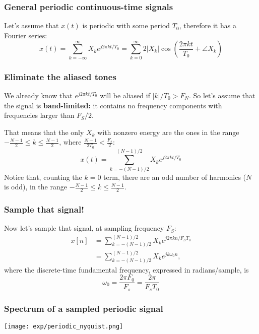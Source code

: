 \documentclass{beamer}
\begin{document}
\begin{frame}
  \frametitle{General periodic continuous-time signals}

  Let's assume that $x(t)$ is periodic with some period $T_0$,
  therefore it has a Fourier series:
  \[
  x(t) = \sum_{k=-\infty}^\infty X_k e^{j2\pi kt/T_0}
  = \sum_{k=0}^\infty 2|X_k|\cos\left(\frac{2\pi kt}{T_0}+\angle X_k\right)
  \]
\end{frame}

\begin{frame}
  \frametitle{Eliminate the aliased tones}

  We already know that $e^{j2\pi kt/T_0}$ will be aliased if $|k|/T_0 >
  F_N$.  So let's assume that the signal is {\bf band-limited:} it
  contains no frequency components with frequencies larger than $F_S/2$.

  That means that the only $X_k$ with nonzero energy are the ones in
  the range $-\frac{N-1}{2}\le k\le \frac{N-1}{2}$, where
  $\frac{N-1}{2T_0}<\frac{F_s}{2}$:
  \[
  x(t) = \sum_{k=-(N-1)/2}^{(N-1)/2} X_k e^{j2\pi kt/T_0}
  \]
  Notice that, counting the $k=0$ term, there are an odd number of
  harmonics ($N$ is odd), in the range $-\frac{N-1}{2}\le k\le
  \frac{N-1}{2}$.
\end{frame}

\begin{frame}
  \frametitle{Sample that signal!}

  Now let's sample that signal, at sampling frequency $F_S$:
  \begin{align*}
    x[n] &= \sum_{k=-(N-1)/2}^{(N-1)/2} X_k e^{j2\pi k n/F_ST_0}\\
    &= \sum_{k=-(N-1)/2}^{(N-1)/2} X_k e^{jk \omega_0 n},
  \end{align*}
  where the discrete-time fundamental frequency, expressed in radians/sample, is
  \begin{displaymath}
    \omega_0 = \frac{2\pi F_0}{F_s} = \frac{2\pi}{F_sT_0}
  \end{displaymath}
\end{frame}

\begin{frame}
  \frametitle{Spectrum of a sampled periodic signal}


  \centerline{\texttt{[image: exp/periodic\_nyquist.png]}}
\end{frame}
\end{document}
